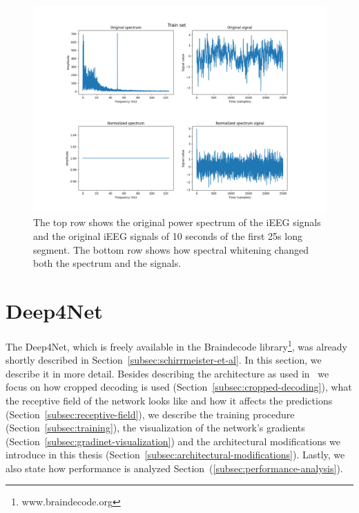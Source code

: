\begin{figure}[!htbp]
\centering
\includegraphics[width=\linewidth]{img/ch3/spectral-whitening}
\caption[Spectral whitening]{The top row shows the original power spectrum of the iEEG signals and the original iEEG signals of 10 seconds of the first 25s long segment.
The bottom row shows how spectral whitening changed both the spectrum and the signals.}
\label{fig:spectral-whitening}
\end{figure}


\section{Deep4Net}\label{sec:deep4net}
The Deep4Net, which is freely available in the Braindecode library\footnote{www.braindecode.org}, was already shortly described in Section~\ref{subsec:schirrmeister-et-al}.
In this section, we describe it in more detail. 
Besides describing the architecture as used in~\cite{Hammer-2021} we focus on how cropped decoding is used (Section~\ref{subsec:cropped-decoding}), what the receptive field of the network looks like and how it affects the predictions (Section~\ref{subsec:receptive-field}), we describe the training procedure (Section~\ref{subsec:training}), the visualization of the network's gradients (Section~\ref{subsec:gradinet-visualization}) and the architectural modifications we introduce in this thesis (Section~\ref{subsec:architectural-modifications}). Lastly, we also state how performance is analyzed Section~(\ref{subsec:performance-analysis}).


